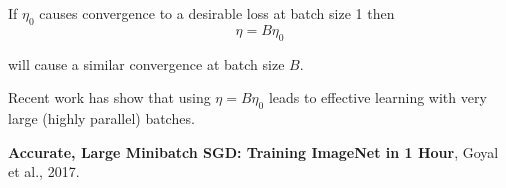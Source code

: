 {\vfill
If $\eta_0$ causes convergence to a desirable loss at batch size 1 then
$$\eta = B \eta_0$$

\vfill
will cause a similar convergence at batch size $B$.


Recent work has show that using $\eta = B\eta_0$ leads to effective learning with very large (highly parallel)
batches.

\vfill
{\bf Accurate, Large Minibatch SGD: Training ImageNet in 1 Hour}, Goyal et al., 2017.



} 

